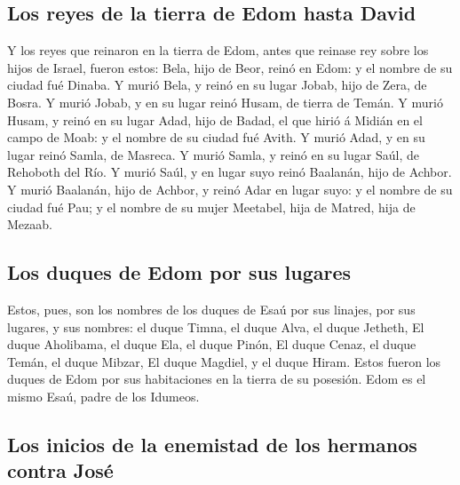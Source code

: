 \hypertarget{los-reyes-de-la-tierra-de-edom-hasta-david}{%
\subsection{Los reyes de la tierra de Edom hasta
David}\label{los-reyes-de-la-tierra-de-edom-hasta-david}}

 Y los reyes que reinaron en la tierra de Edom, antes que
reinase rey sobre los hijos de Israel, fueron estos: 
Bela, hijo de Beor, reinó en Edom: y el nombre de su ciudad fué Dinaba.
 Y murió Bela, y reinó en su lugar Jobab, hijo de Zera,
de Bosra.  Y murió Jobab, y en su lugar reinó Husam, de
tierra de Temán.  Y murió Husam, y reinó en su lugar
Adad, hijo de Badad, el que hirió á Midián en el campo de Moab: y el
nombre de su ciudad fué Avith.  Y murió Adad, y en su
lugar reinó Samla, de Masreca.  Y murió Samla, y reinó en
su lugar Saúl, de Rehoboth del Río.  Y murió Saúl, y en
lugar suyo reinó Baalanán, hijo de Achbor.  Y murió
Baalanán, hijo de Achbor, y reinó Adar en lugar suyo: y el nombre de su
ciudad fué Pau; y el nombre de su mujer Meetabel, hija de Matred, hija
de Mezaab.

\hypertarget{los-duques-de-edom-por-sus-lugares}{%
\subsection{Los duques de Edom por sus
lugares}\label{los-duques-de-edom-por-sus-lugares}}

 Estos, pues, son los nombres de los duques de Esaú por
sus linajes, por sus lugares, y sus nombres: el duque Timna, el duque
Alva, el duque Jetheth,  El duque Aholibama, el duque
Ela, el duque Pinón,  El duque Cenaz, el duque Temán, el
duque Mibzar,  El duque Magdiel, y el duque Hiram. Estos
fueron los duques de Edom por sus habitaciones en la tierra de su
posesión. Edom es el mismo Esaú, padre de los Idumeos.

\hypertarget{los-inicios-de-la-enemistad-de-los-hermanos-contra-josuxe9}{%
\subsection{Los inicios de la enemistad de los hermanos contra
José}\label{los-inicios-de-la-enemistad-de-los-hermanos-contra-josuxe9}}


